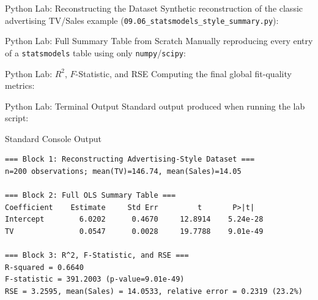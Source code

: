 \documentclass[10pt, aspectratio=169]{beamer}
\begin{document}
\begin{frame}[fragile]{Python Lab: Reconstructing the Dataset}
  \scriptsize
  Synthetic reconstruction of the classic advertising TV/Sales example (\texttt{09.06\_statsmodels\_style\_summary.py}):
  {
  }
\end{frame}

\begin{frame}[fragile]{Python Lab: Full Summary Table from Scratch}
  \scriptsize
  Manually reproducing every entry of a \texttt{statsmodels} table using only \texttt{numpy}/\texttt{scipy}:
  {
  }
\end{frame}

\begin{frame}[fragile]{Python Lab: $R^2$, $F$-Statistic, and RSE}
  \scriptsize
  Computing the final global fit-quality metrics:
  {
  }
\end{frame}

\begin{frame}[fragile]{Python Lab: Terminal Output}
  \scriptsize
  Standard output produced when running the lab script:
  \vspace{0.02cm}
  \begin{block}{Standard Console Output}
    \fontsize{3.4pt}{4.1pt}\selectfont
    \begin{verbatim}
=== Block 1: Reconstructing Advertising-Style Dataset ===
n=200 observations; mean(TV)=146.74, mean(Sales)=14.05

=== Block 2: Full OLS Summary Table ===
Coefficient    Estimate     Std Err         t       P>|t|
Intercept        6.0202      0.4670     12.8914    5.24e-28
TV               0.0547      0.0028     19.7788    9.01e-49

=== Block 3: R^2, F-Statistic, and RSE ===
R-squared = 0.6640
F-statistic = 391.2003 (p-value=9.01e-49)
RSE = 3.2595, mean(Sales) = 14.0533, relative error = 0.2319 (23.2%)
    \end{verbatim}
  \end{block}
\end{frame}
\end{document}
